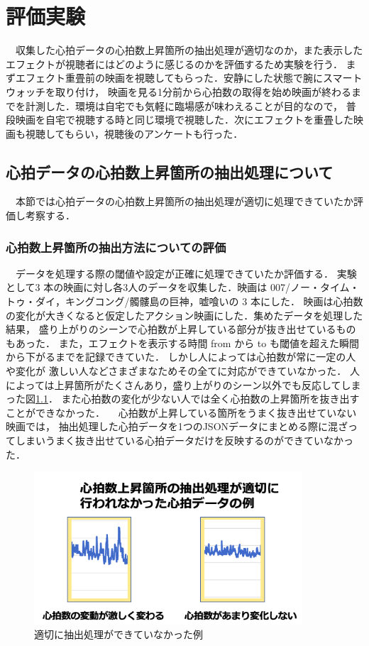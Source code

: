 \thispagestyle{myheadings}
\chapter{評価実験}

　収集した心拍データの心拍数上昇箇所の抽出処理が適切なのか，また表示したエフェクトが視聴者にはどのように感じるのかを評価するため実験を行う．
まずエフェクト重畳前の映画を視聴してもらった．安静にした状態で腕にスマートウォッチを取り付け，
映画を見る1分前から心拍数の取得を始め映画が終わるまでを計測した．環境は自宅でも気軽に臨場感が味わえることが目的なので，
普段映画を自宅で視聴する時と同じ環境で視聴した．次にエフェクトを重畳した映画も視聴してもらい，視聴後のアンケートも行った．

\section{心拍データの心拍数上昇箇所の抽出処理について}
　本節では心拍データの心拍数上昇箇所の抽出処理が適切に処理できていたか評価し考察する．

\subsection{心拍数上昇箇所の抽出方法についての評価}
　データを処理する際の閾値や設定が正確に処理できていたか評価する．
実験として3 本の映画に対し各3人のデータを収集した．映画は 007/ノー・タイム・トゥ・ダイ，キングコング/髑髏島の巨神，嘘喰いの 3 本にした．
映画は心拍数の変化が大きくなると仮定したアクション映画にした．集めたデータを処理した結果，
盛り上がりのシーンで心拍数が上昇している部分が抜き出せているものもあった．
また，エフェクトを表示する時間 from から to も閾値を超えた瞬間から下がるまでを記録できていた．
しかし人によっては心拍数が常に一定の人や変化が 激しい人などさまざまなためその全てに対応ができていなかった．
人によっては上昇箇所がたくさんあり，盛り上がりのシーン以外でも反応してしまった図\ref{kekka}．
また心拍数の変化が少ない人では全く心拍数の上昇箇所を抜き出すことができなかった．
　心拍数が上昇している箇所をうまく抜き出せていない映画では，
抽出処理した心拍データを1つのJSONデータにまとめる際に混ざってしまいうまく抜き出せている心拍データだけを反映するのができていなかった．

\begin{figure}[H]
    \centering
    \includegraphics[width=10cm]{images/chapter4/miss.png}
    \caption{適切に抽出処理ができていなかった例}
    \label{kekka}
\end{figure}


